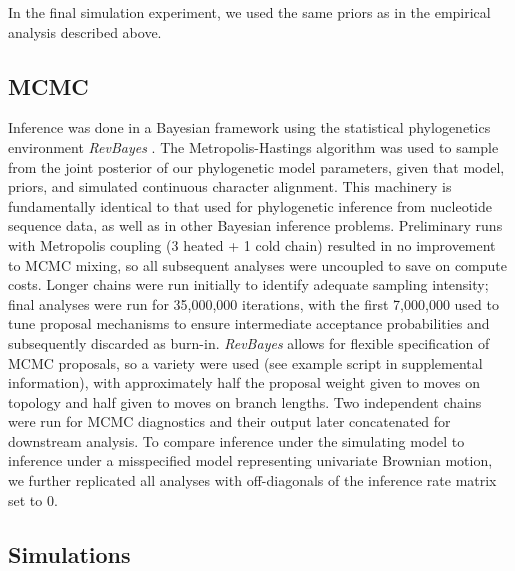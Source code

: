 \documentclass[10pt, twocolumn, twoside]{article}
\begin{document}
In the final simulation experiment, we used the same priors as in the empirical analysis described above.

\subsection{MCMC}

Inference was done in a Bayesian framework using the statistical phylogenetics environment \textit{RevBayes} \citep{hohnaRevBayesBayesianPhylogenetic2016a}. The Metropolis-Hastings algorithm \citep{hastingsMonteCarloSampling1970} was used to sample from the joint posterior of our phylogenetic model parameters, given that model, priors, and simulated continuous character alignment. This machinery is fundamentally identical to that used for phylogenetic inference from nucleotide sequence data, as well as in other Bayesian inference problems. Preliminary runs with Metropolis coupling (3 heated + 1 cold chain) resulted in no improvement to MCMC mixing, so all subsequent analyses were uncoupled to save on compute costs. Longer chains were run initially to identify adequate sampling intensity; final analyses were run for 35,000,000 iterations, with the first 7,000,000 used to tune proposal mechanisms to ensure intermediate acceptance probabilities and subsequently discarded as burn-in. \textit{RevBayes} allows for flexible specification of MCMC proposals, so a variety were used (see example script in supplemental information), with approximately half the proposal weight given to moves on topology and half given to moves on branch lengths. Two independent chains were run for MCMC diagnostics and their output later concatenated for downstream analysis. To compare inference under the simulating model to inference under a misspecified model representing univariate Brownian motion, we further replicated all analyses with off-diagonals of the inference rate matrix set to 0.

\subsection{Simulations}
\end{document}
